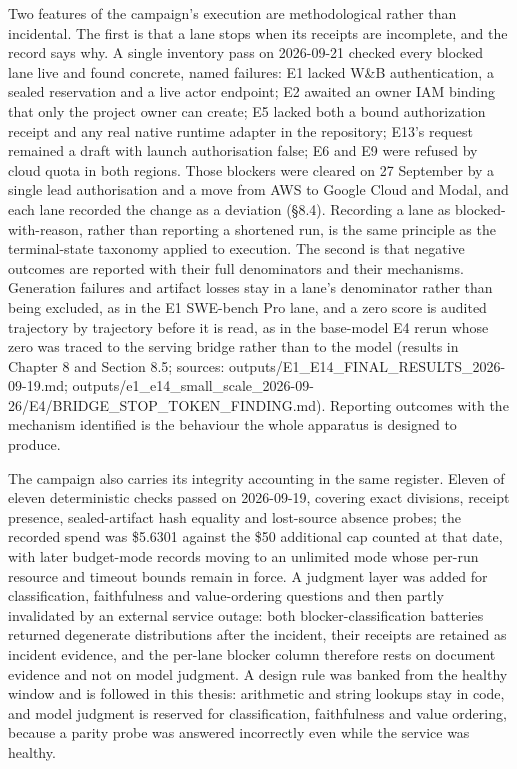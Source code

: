 \documentclass[12pt,a4paper]{report}
\begin{document}
Two features of the campaign's execution are methodological rather than
incidental. The first is that a lane stops when its receipts are
incomplete, and the record says why. A single inventory pass on
2026-09-21 checked every blocked lane live and found concrete, named
failures: E1 lacked W\&B authentication, a sealed reservation and a live
actor endpoint; E2 awaited an owner IAM binding that only the project
owner can create; E5 lacked both a bound authorization receipt and any
real native runtime adapter in the repository; E13's request remained a
draft with launch authorisation false; E6 and E9 were refused by cloud
quota in both regions. Those blockers were cleared on 27 September by a
single lead authorisation and a move from AWS to Google Cloud and Modal,
and each lane recorded the change as a deviation (§8.4). Recording a
lane as blocked-with-reason, rather than reporting a shortened run, is
the same principle as the terminal-state taxonomy applied to execution.
The second is that negative outcomes are reported with their full
denominators and their mechanisms. Generation failures and artifact
losses stay in a lane's denominator rather than being excluded, as in
the E1 SWE-bench Pro lane, and a zero score is audited trajectory by
trajectory before it is read, as in the base-model E4 rerun whose zero
was traced to the serving bridge rather than to the model (results in
Chapter 8 and Section 8.5; sources:
outputs/E1\_\allowbreak{}E14\_\allowbreak{}FINAL\_\allowbreak{}RESULTS\_\allowbreak{}2026-09-19.md;
outputs/e1\_\allowbreak{}e14\_\allowbreak{}small\_\allowbreak{}scale\_\allowbreak{}2026-09-26/E4/BRIDGE\_\allowbreak{}STOP\_\allowbreak{}TOKEN\_\allowbreak{}FINDING.md).
Reporting outcomes with the mechanism identified is the behaviour the
whole apparatus is designed to produce.

The campaign also carries its integrity accounting in the same register.
Eleven of eleven deterministic checks passed on 2026-09-19, covering
exact divisions, receipt presence, sealed-artifact hash equality and
lost-source absence probes; the recorded spend was \$5.6301 against the
\$50 additional cap counted at that date, with later budget-mode records
moving to an unlimited mode whose per-run resource and timeout bounds
remain in force. A judgment layer was added for classification,
faithfulness and value-ordering questions and then partly invalidated by
an external service outage: both blocker-classification batteries
returned degenerate distributions after the incident, their receipts are
retained as incident evidence, and the per-lane blocker column therefore
rests on document evidence and not on model judgment. A design rule was
banked from the healthy window and is followed in this thesis:
arithmetic and string lookups stay in code, and model judgment is
reserved for classification, faithfulness and value ordering, because a
parity probe was answered incorrectly even while the service was
healthy.
\end{document}
